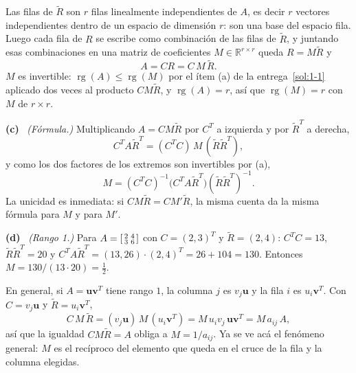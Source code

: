 \documentclass[11pt,a4paper]{article}
\newcommand{\bi}[1]{\boldsymbol{#1}}
\newcommand{\R}{\mathbb{R}}
\newcommand{\bu}{\bi{u}}  \newcommand{\bv}{\bi{v}}  \newcommand{\bw}{\bi{w}}
\DeclareMathOperator{\rg}{rg}
\newcounter{entrega}[section]
\newcommand{\itemsol}[1]{\par\medskip\noindent\textbf{(#1)}\ \ignorespaces}
\begin{document}
Las filas de $\widetilde R$ son $r$ filas linealmente independientes de $A$, es
decir $r$ vectores independientes dentro de un espacio de dimensión $r$: son una
base del espacio fila. Luego cada fila de $R$ se escribe como combinación de las
filas de $\widetilde R$, y juntando esas combinaciones en una matriz de
coeficientes $M\in\R^{r\times r}$ queda $R=M\widetilde R$ y
\[
A=CR=C\,M\,\widetilde R .
\]
$M$ es invertible: $\rg(A)\le\rg(M)$ por el ítem (a) de la
entrega~\ref{sol:1-1} aplicado dos veces al producto $CM\widetilde R$, y
$\rg(A)=r$, así que $\rg(M)=r$ con $M$ de $r\times r$.

\itemsol{c} \emph{(Fórmula.)} Multiplicando $A=CM\widetilde R$ por $C^T$ a
izquierda y por $\widetilde R^T$ a derecha,
\[
C^TA\widetilde R^T=(C^TC)\,M\,(\widetilde R\widetilde R^T),
\]
y como los dos factores de los extremos son invertibles por (a),
\[
M=(C^TC)^{-1}\big(C^TA\widetilde R^T\big)(\widetilde R\widetilde R^T)^{-1}.
\tag{$*$}
\]
La unicidad es inmediata: si $CM\widetilde R=CM'\widetilde R$, la misma cuenta
da la misma fórmula para $M$ y para $M'$.

\itemsol{d} \emph{(Rango 1.)} Para
$A=\begin{bsmallmatrix}2&4\\3&6\end{bsmallmatrix}$ con $C=(2,3)^T$ y
$\widetilde R=(2,4)$: $C^TC=13$, $\widetilde R\widetilde R^T=20$ y
$C^TA\widetilde R^T=(13,26)\cdot(2,4)^T=26+104=130$. Entonces
$M=130/(13\cdot20)=\tfrac12$.

En general, si $A=\bu\bv^T$ tiene rango $1$, la columna $j$ es $v_j\bu$ y la
fila $i$ es $u_i\bv^T$. Con $C=v_j\bu$ y $\widetilde R=u_i\bv^T$,
\[
C\,M\,\widetilde R=(v_j\bu)\,M\,(u_i\bv^T)=M\,u_iv_j\,\bu\bv^T=M\,a_{ij}\,A ,
\]
así que la igualdad $CM\widetilde R=A$ obliga a $M=1/a_{ij}$. Ya se ve acá el
fenómeno general: $M$ es el recíproco del elemento que queda en el cruce de la
fila y la columna elegidas.
\end{document}
